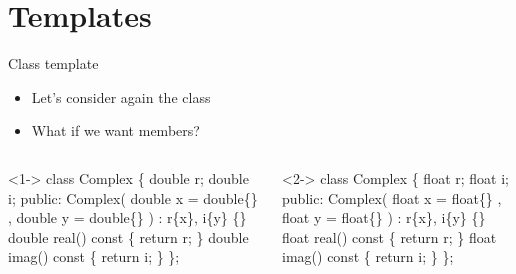 

\section*{Templates}

\begin{frame}[fragile]{Class template}

  \begin{itemize}
  \item<1-> Let's consider again the  class
  \item<2-> What if we want  members?
  \end{itemize}

  \begin{columns}[t]

  \begin{column}{.5\textwidth}
    \begin{codeblock}<1->{
class Complex \{
  \alert{double} r;
  \alert{double} i;
 public:
  Complex(
      \alert{double} x = \alert{double}\{\}
    , \alert{double} y = \alert{double}\{\}
  ) : r\{x\}, i\{y\} \{\}
  \alert{double} real() const \{ return r; \}
  \alert{double} imag() const \{ return i; \}
\};}\end{codeblock}

  \end{column}
  \begin{column}{.5\textwidth}
    \begin{codeblock}<2->{
class Complex \{
  \alert{float} r;
  \alert{float} i;
 public:
  Complex(
      \alert{float} x = \alert{float}\{\}
    , \alert{float} y = \alert{float}\{\}
  ) : r\{x\}, i\{y\} \{\}
  \alert{float} real() const \{ return r; \}
  \alert{float} imag() const \{ return i; \}
\};}\end{codeblock}

  \end{column}

  \end{columns}

\end{frame}

